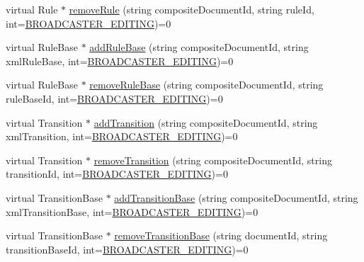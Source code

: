 \begin{DoxyCompactItemize}
\item 
virtual Rule $\ast$ \hyperlink{classbr_1_1ufscar_1_1lince_1_1ginga_1_1wac_1_1editing_1_1IFormatterAdapter_ab50348d88204b6e715d1fd14ad485661}{removeRule} (string compositeDocumentId, string ruleId, int=\hyperlink{classbr_1_1ufscar_1_1lince_1_1ginga_1_1wac_1_1editing_1_1IFormatterAdapter_a60586f9a11e5cefcfecef9386c28d4bd}{BROADCASTER\_\-EDITING})=0
\item 
virtual RuleBase $\ast$ \hyperlink{classbr_1_1ufscar_1_1lince_1_1ginga_1_1wac_1_1editing_1_1IFormatterAdapter_a0d65630a7f103c38c04e06c8a584ecba}{addRuleBase} (string compositeDocumentId, string xmlRuleBase, int=\hyperlink{classbr_1_1ufscar_1_1lince_1_1ginga_1_1wac_1_1editing_1_1IFormatterAdapter_a60586f9a11e5cefcfecef9386c28d4bd}{BROADCASTER\_\-EDITING})=0
\item 
virtual RuleBase $\ast$ \hyperlink{classbr_1_1ufscar_1_1lince_1_1ginga_1_1wac_1_1editing_1_1IFormatterAdapter_a9b854fb32b46e6e16557cf2fc24e2f09}{removeRuleBase} (string compositeDocumentId, string ruleBaseId, int=\hyperlink{classbr_1_1ufscar_1_1lince_1_1ginga_1_1wac_1_1editing_1_1IFormatterAdapter_a60586f9a11e5cefcfecef9386c28d4bd}{BROADCASTER\_\-EDITING})=0
\item 
virtual Transition $\ast$ \hyperlink{classbr_1_1ufscar_1_1lince_1_1ginga_1_1wac_1_1editing_1_1IFormatterAdapter_a48ed4a114eced574f59aaf3620c2762e}{addTransition} (string compositeDocumentId, string xmlTransition, int=\hyperlink{classbr_1_1ufscar_1_1lince_1_1ginga_1_1wac_1_1editing_1_1IFormatterAdapter_a60586f9a11e5cefcfecef9386c28d4bd}{BROADCASTER\_\-EDITING})=0
\item 
virtual Transition $\ast$ \hyperlink{classbr_1_1ufscar_1_1lince_1_1ginga_1_1wac_1_1editing_1_1IFormatterAdapter_adc780d90fe7d64924f7e04aaf81c3462}{removeTransition} (string compositeDocumentId, string transitionId, int=\hyperlink{classbr_1_1ufscar_1_1lince_1_1ginga_1_1wac_1_1editing_1_1IFormatterAdapter_a60586f9a11e5cefcfecef9386c28d4bd}{BROADCASTER\_\-EDITING})=0
\item 
virtual TransitionBase $\ast$ \hyperlink{classbr_1_1ufscar_1_1lince_1_1ginga_1_1wac_1_1editing_1_1IFormatterAdapter_a5663e47a9808301d1895a88956e8675c}{addTransitionBase} (string compositeDocumentId, string xmlTransitionBase, int=\hyperlink{classbr_1_1ufscar_1_1lince_1_1ginga_1_1wac_1_1editing_1_1IFormatterAdapter_a60586f9a11e5cefcfecef9386c28d4bd}{BROADCASTER\_\-EDITING})=0
\item 
virtual TransitionBase $\ast$ \hyperlink{classbr_1_1ufscar_1_1lince_1_1ginga_1_1wac_1_1editing_1_1IFormatterAdapter_aaea7ab5bcc692f8cfdd807a8caf2eca7}{removeTransitionBase} (string documentId, string transitionBaseId, int=\hyperlink{classbr_1_1ufscar_1_1lince_1_1ginga_1_1wac_1_1editing_1_1IFormatterAdapter_a60586f9a11e5cefcfecef9386c28d4bd}{BROADCASTER\_\-EDITING})=0

\end{DoxyCompactItemize}
